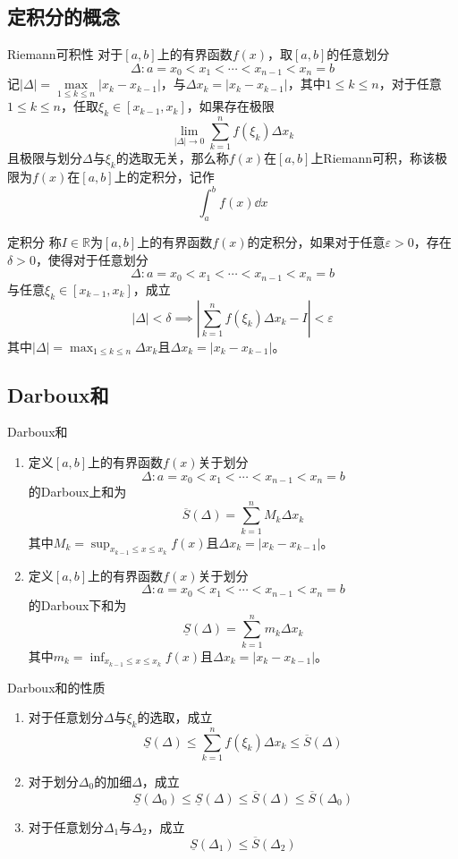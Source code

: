 \documentclass[lang = cn, scheme = chinese, thmcnt = section]{elegantbook}
\newcommand{\R}{\mathbb{R}}            %
\begin{document}
\subsection{定积分的概念}

\begin{definition}{Riemann可积性}
	对于$[a,b]$上的有界函数$f(x)$，取$[a,b]$的任意划分
	$$
	\Delta:a=x_0<x_1<\cdots<x_{n-1}<x_n=b
	$$
	记$|\Delta|=\max\limits_{1\le k\le n}|x_{k}-x_{k-1}|$，与$\Delta x_k=|x_k-x_{k-1}|$，其中$1\le k \le n$，对于任意$1\le k\le n$，任取$\xi_k\in[x_{k-1},x_k]$，如果存在极限
	$$
	\lim_{|\Delta|\to 0}\sum_{k=1}^{n}f(\xi_k)\Delta x_k
	$$
	且极限与划分$\Delta$与$\xi_k$的选取无关，那么称$f(x)$在$[a,b]$上Riemann可积，称该极限为$f(x)$在$[a,b]$上的定积分，记作
	$$
	\int_a^b f(x)\dd x
	$$
\end{definition}

\begin{definition}{定积分}
	称$I\in\R$为$[a,b]$上的有界函数$f(x)$的定积分，如果对于任意$\varepsilon>0$，存在$\delta>0$，使得对于任意划分
	$$
	\Delta:a=x_0<x_1<\cdots<x_{n-1}<x_n=b
	$$
	与任意$\xi_k\in[x_{k-1},x_k]$，成立
	$$
	|\Delta|<\delta
	\implies
	\left|\sum_{k=1}^{n}f(\xi_k)\Delta x_k-I\right|<\varepsilon
	$$
	其中$\displaystyle|\Delta|=\max_{1\le k\le n}\Delta x_k$且$\Delta x_k=|x_k-x_{k-1}|$。
\end{definition}

\subsection{Darboux和}

\begin{definition}{Darboux和}
	\begin{enumerate}
		\item 定义$[a,b]$上的有界函数$f(x)$关于划分
		$$
		\Delta:a=x_0<x_1<\cdots<x_{n-1}<x_n=b
		$$
		的Darboux上和为
		$$
		\overline{S}(\Delta)
		=\sum_{k=1}^{n}M_k\Delta x_k
		$$
		其中$\displaystyle M_k=\sup_{x_{k-1}\le x\le x_k}f(x)$且$\Delta x_k=|x_k-x_{k-1}|$。
		\item 定义$[a,b]$上的有界函数$f(x)$关于划分
		$$
		\Delta:a=x_0<x_1<\cdots<x_{n-1}<x_n=b
		$$
		的Darboux下和为
		$$
		\underline{S}(\Delta)
		=\sum_{k=1}^{n}m_k\Delta x_k
		$$
		其中$\displaystyle m_k=\inf_{x_{k-1}\le x\le x_k}f(x)$且$\Delta x_k=|x_k-x_{k-1}|$。
	\end{enumerate}
\end{definition}

\begin{proposition}{Darboux和的性质}
	\begin{enumerate}
		\item 对于任意划分$\Delta$与$\xi_k$的选取，成立
		$$
		\underline{S}(\Delta)
		\le\sum_{k=1}^{n}f(\xi_k)\Delta x_k
		\le\overline{S}(\Delta)
		$$
		\item 对于划分$\Delta_0$的加细$\Delta$，成立
		$$
		\underline{S}(\Delta_0)
		\le\underline{S}(\Delta)
		\le \overline{S}(\Delta)
		\le\overline{S}(\Delta_0)
		$$
		\item 对于任意划分$\Delta_1$与$\Delta_2$，成立
		$$
		\underline{S}(\Delta_1)
		\le \overline{S}(\Delta_2)
		$$
	\end{enumerate}
\end{proposition}
\end{document}
